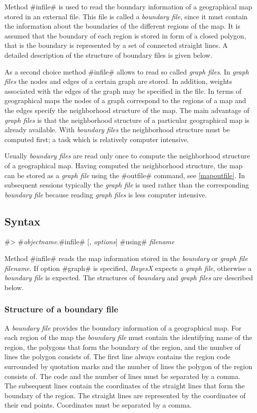 Method #infile# is used to read the boundary information of a
geographical map stored in an external file. This file is called a
{\em boundary file}, since it must contain the information about
the boundaries of the different regions of the map. It is assumed
that the boundary of each region is stored in form of a closed
polygon, that is the boundary is represented by a set of connected
straight lines. A detailed description of the structure of
boundary files is given below.

As a second choice method #infile# allows to read  so called {\em
graph files}. In {\em graph files} the nodes and edges of a
certain graph are stored. In addition, weights associated with the
edges of the graph may be specified in the file. In terms of
geographical maps the nodes of a graph correspond to the regions
of a map and the edges specify the neighborhood structure of the
map. The main advantage of {\em graph files} is that the
neighborhood structure of a particular geographical map is already
available. With {\em boundary files} the neighborhood structure
must be computed first; a task which is relatively computer
intensive.

Usually {\em boundary files} are read  only once to compute the
neighborhood structure of a geographical map. Having computed the
neighborhood structure, the map can be stored as a {\em graph
file} using the #outfile# command, see \autoref{mapoutfile}. In
subsequent sessions typically the {\em graph file} is used rather
than the corresponding {\em boundary file} because reading {\em
graph files} is less computer intensive.


\subsection{Syntax}

#> #{\em objectname}.#infile# [{\em , options}] #using# {\em filename}

Method #infile# reads the map information stored in the {\em
boundary} or {\em graph file} {\em filename}. If option #graph# is
specified, {\em BayesX} expects a {\em graph file}, otherwise a
{\em boundary file}
is expected. The structures of {\em boundary} and {\em graph files} are described below.

\subsubsection*{Structure of a boundary file}

A {\em boundary file} provides the boundary information of a
geographical map. For each region of the map the {\em boundary
file} must contain the identifying name of the region, the
polygons that form the boundary of the region, and the number of
lines the polygon consists of. The first line always contains the
region code surrounded by quotation marks and the number of lines
the polygon of the region consists of. The code and the number of
lines must be separated by a comma. The subsequent lines contain
the coordinates of the straight lines that form the boundary of
the region. The straight lines are represented by the coordinates
of their end points. Coordinates must be separated by a comma.


